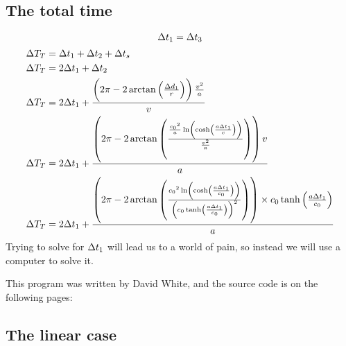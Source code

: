 	\subsection{The total time}
		\[\mathrm{\Delta} t_1 = \mathrm{\Delta} t_3\]
		\begin{align*}
			\Del T_T &= \Del t_1 + \Del t_2 + \Del t_s\\
			\Del T_T &= 2\Del t_1 + \Del t_2\\
			\Del T_T &= 2\Del t_1 + \frac{\left(2\pi - 2\arctan\left(\frac{\Del d_1}{r}\right)\right) \frac{v^2}{a}}{v}\\
			\Del T_T &= 2\Del t_1+\frac{\left(2\pi - 2\arctan\left(\frac{\frac{\si{\clight}^2}{a}\ln\left(\cosh\left(\frac{a\Del t_1}{c}\right)\right)}{\frac{v^2}{a}}\right)\right) v}{a}\\
			\Del T_T &= 2\Del t_1+\frac{\left(2\pi-2\arctan\left(\frac{\si{\clight}^2\ln\left(\cosh\left(\frac{a\Del t_1}{\si{\clight}}\right)\right)}{\left(\si{\clight}\tanh\left(\frac{a\Del t_1}{\si{\clight}}\right)\right)^2}\right)\right) \times \si{\clight}\tanh\left(\frac{a\Del t_1}{\si{\clight}}\right)}{a}
		\end{align*}
		Trying to solve for $\mathrm{\Delta} t_1$ will lead us to a world of pain, so instead we will use a computer to solve it.

		This program was written by David White, and the source code is on the following pages:
		\newpage
		
		\newpage
	\subsection{The linear case}
		
